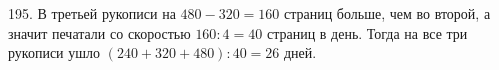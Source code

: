 195. В третьей рукописи на $480-320=160$ страниц больше, чем во второй, а значит печатали со скоростью $160:4=40$ страниц в день. Тогда на все три рукописи ушло $(240+320+480):40=26$ дней.\\
